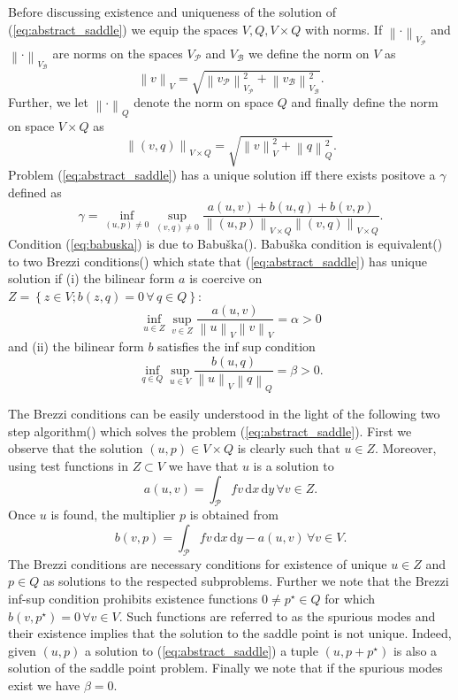 \documentclass[a4paper,10pt]{article}
\newcommand{\norm}[1]{\ensuremath{\left\|#1\right\|}}
\newcommand{\meas}[1]{\ensuremath{\,\mathrm{d}#1}}
\newcommand{\Vp}{\ensuremath{V_{\mathcal{P}}}}
\newcommand{\Vb}{\ensuremath{V_{\mathcal{B}}}}
\newcommand{\vp}{\ensuremath{v_{\mathcal{P}}}}
\newcommand{\vb}{\ensuremath{v_{\mathcal{B}}}}
\begin{document}
  Before discussing existence and uniqueness of the solution of
  (\ref{eq:abstract_saddle}) we equip the spaces $V, Q, V\times Q$ with norms.
  If $\norm{\cdot}_{\Vp}$ and $\norm{\cdot}_{\Vb}$ are norms on the spaces $\Vp$
  and $\Vb$ we define the norm on $V$ as 
  \[
    \norm{v}_V=\sqrt{\norm{\vp}^2_{\Vp} + \norm{\vb}^2_{\Vb}}.
  \] Further, we let $\norm{\cdot}_{Q}$
  denote the norm on space $Q$ and finally define the norm on space $V\times Q$
  as 
  \[
    \norm{(v, q)}_{V\times Q}=\sqrt{\norm{v}^2_V +\norm{q}^2_Q}.
  \]
  Problem (\ref{eq:abstract_saddle}) has a unique solution iff there exists
  positove a $\gamma$ defined as
  \begin{equation}
    \label{eq:babuska}
    \gamma=\inf_{(u, p)\neq 0}\sup_{(v, q) \neq 0}
    \frac{a(u, v) + b(u, q) + b(v, p)}
    {\norm{(u, p)}_{V\times Q}  \norm{(v, q)}_{V\times Q}}.
  \end{equation}
  Condition (\ref{eq:babuska}) is due to Babu\v ska(\cite{babuska_error,
  babuska_lag}). Babu\v ska condition is equivalent(\cite{equiv}) to two Brezzi
  conditions(\cite{brezzi}) which
  state that (\ref{eq:abstract_saddle}) has unique solution if (i) the
  bilinear form $a$ is coercive on $Z=\left\{z\in V; b(z, q)=0\,\forall\,q\in Q\right\}$:
  \begin{equation}
    \label{eq:brezzi_coer}
    \inf_{u\in Z}\sup_{v\in Z} \frac{a(u, v)}{\norm{u}_V\norm{v}_V} = \alpha > 0
  \end{equation}
  and (ii) the bilinear form $b$ satisfies the inf sup condition
  \begin{equation}
    \label{eq:brezzi_infsup}
    \inf_{q\in Q}\sup_{u \in V} \frac{b(u, q)}{\norm{u}_V\norm{q}_Q}
    = \beta > 0.
  \end{equation}
  
  The Brezzi conditions can be easily understood in the light of the following
  two step algorithm(\cite{scott}) which solves the problem (\ref{eq:abstract_saddle}). First
  we observe that the solution $(u, p)\in V\times Q$ is clearly such that
  $u\in Z$. Moreover, using test functions in $Z\subset V$ we have that $u$
  is a solution to
  \[
    a(u, v) = \int_{\mathcal{P}} f v\meas{x}\meas{y}\,\forall v\in Z.
  \]
  Once $u$ is found, the multiplier $p$ is obtained from
  \[
    b(v, p) = \int_{\mathcal{P}} f v\meas{x}\meas{y} - a(u, v)\,\forall v\in V.
  \]
  The Brezzi conditions are necessary conditions for existence of unique
  $u\in Z$ and $p\in Q$ as solutions to the respected subproblems. Further
  we note that the Brezzi inf-sup condition prohibits existence functions
  $0\neq p^{\star}\in Q$ for which $b(v, p^{\star})=0\,\forall v\in V$.
  Such functions are referred to as the spurious modes and their existence
  implies that the solution to the saddle point is not unique. Indeed, given
  $(u, p)$ a solution to (\ref{eq:abstract_saddle}) a tuple $(u, p+p^{\star})$
  is also a solution of the saddle point problem. Finally we note that if
  the spurious modes exist we have $\beta=0$.
\end{document}
